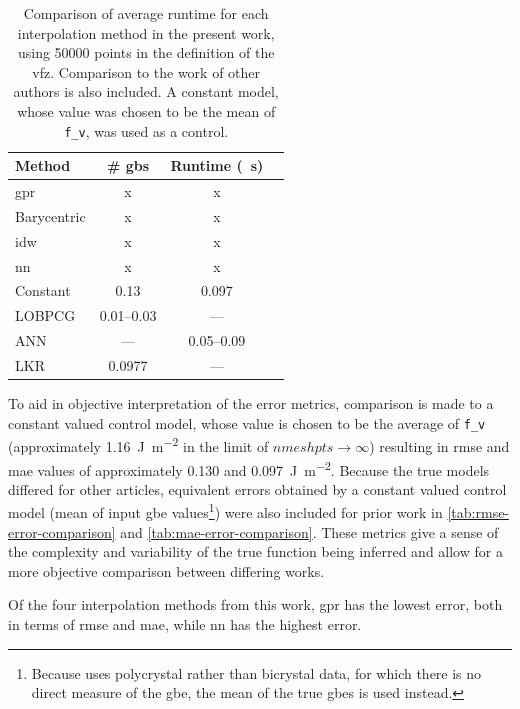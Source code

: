 \documentclass[preprint,12pt]{elsarticle}
\begin{document}
\begin{table}
\caption{Comparison of average runtime for each interpolation method in the present work, using \num{50000} points in the definition of the \gls{vfz}. Comparison to the work of other authors is also included. A constant model, whose value was chosen to be the mean of \texttt{f\_v}, was used as a control.}
\centering
\begin{tabular}{lccc}
\toprule
Method & \# \glspl{gb} & Runtime (\SI{}{\second}) \\
\midrule
\Gls{gpr} & x & x \\
Barycentric & x & x \\
\gls{idw} & x & x \\
\gls{nn} & x & x \\
Constant & 0.13 & 0.097 \\
LOBPCG \cite{shenDeterminingGrainBoundary2019} & 0.01--0.03 & --- \\
ANN \cite{echeverrirestrepoUsingArtificialNeural2014} & --- & 0.05--0.09 \\
LKR \cite{chesserLearningGrainBoundary2020} & 0.0977 & --- \\
\bottomrule
\end{tabular}
\label{tab:runtime-comparison}
\end{table}

To aid in objective interpretation of the error metrics, comparison is made to a constant valued control model, whose value is chosen to be the average of \texttt{f\_v} (approximately \SI{1.16}{\J\per\square\meter} in the limit of $nmeshpts \rightarrow \infty$) resulting in \gls{rmse} and \gls{mae} values of approximately \num{0.130} and \SI{0.097}{\J\per\square\meter}. Because the true models differed for other articles, equivalent errors obtained by a constant valued control model (mean of input \gls{gbe} values\footnote{Because \cite{shenDeterminingGrainBoundary2019} uses polycrystal rather than bicrystal data, for which there is no direct measure of the \gls{gbe}, the mean of the true \glspl{gbe} is used instead.}) were also included for prior work in \cref{tab:rmse-error-comparison} and \cref{tab:mae-error-comparison}. These metrics give a sense of the complexity and variability of the true function being inferred and allow for a more objective comparison between differing works.

Of the four interpolation methods from this work, \Gls{gpr} has the lowest error, both in terms of \gls{rmse} and \gls{mae}, while \gls{nn} has the highest error. %
\end{document}
